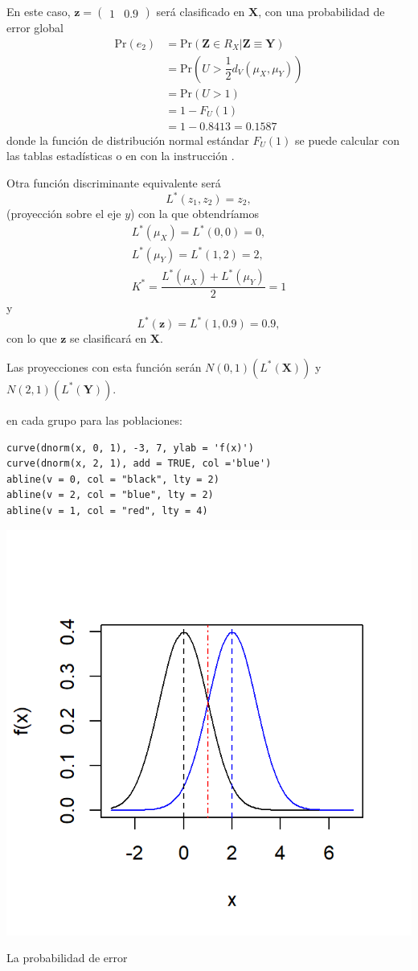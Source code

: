 En este caso, $\mathbf{z}=\begin{pmatrix}
1 & 0.9
\end{pmatrix}$ será clasificado en $\mathbf{X}$, con una probabilidad de error global \begin{align*}
\mathrm{Pr}(e_2)&=\mathrm{Pr}(\mathbf{Z}\in R_X|\mathbf{Z\equiv Y})\\
&=\mathrm{Pr}\left (U>\dfrac{1}{2}d_V(\mu_X,\mu_Y)\right )\\
&=\mathrm{Pr}(U>1)\\
&=1-F_U(1)\\
&=1-0.8413=0.1587
\end{align*}donde la función de distribución normal estándar $F_U(1)$ se puede calcular con las tablas estadísticas o en  con la instrucción .

Otra función discriminante equivalente será \[ L^*(z_1,z_2)=z_2, \](proyección sobre el eje $y$) con la que obtendríamos \[ \begin{array}{c}
L^*(\mu_X)=L^*(0,0)=0,\\
L^*(\mu_Y)=L^*(1,2)=2,\\
K^*=\dfrac{L^*(\mu_X)+L^*(\mu_Y)}{2}=1
\end{array} \]y\[ L^*(\mathbf{z})=L^*(1, 0.9)=0.9, \]con lo que $\mathbf{z}$ se clasificará en $\mathbf{X}$.

Las proyecciones con esta función serán $N(0,1)(L^*(\mathbf{X}))$ y $N(2,1)(L^*(\mathbf{Y}))$.

 en cada grupo para las poblaciones:
\begin{lstlisting}
curve(dnorm(x, 0, 1), -3, 7, ylab = 'f(x)')
curve(dnorm(x, 2, 1), add = TRUE, col ='blue')
abline(v = 0, col = "black", lty = 2)
abline(v = 2, col = "blue", lty = 2)
abline(v = 1, col = "red", lty = 4)
\end{lstlisting}
\begin{center}
\includegraphics[width=0.5\linewidth]{"Temas/Imágenes/Tema 5/screenshot004"}
\end{center}
La probabilidad de error 